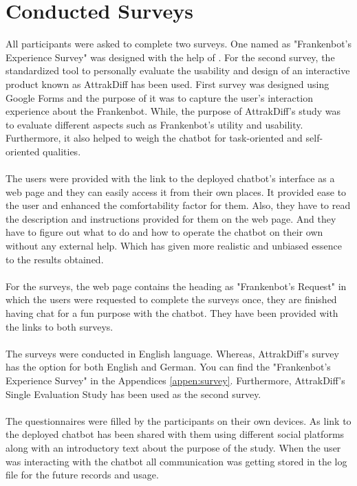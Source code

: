 \section{Conducted Surveys}
All participants were asked to complete two surveys. One named as "Frankenbot's Experience Survey" was designed with the help of \cite{MOLLER200726}\cite{itut}. For the second survey, the standardized tool to personally evaluate the usability and design of an interactive product known as AttrakDiff\cite{attrakdiff} has been used. First survey was designed using Google Forms and the purpose of it was to capture the user's interaction experience about the Frankenbot. While, the purpose of AttrakDiff's study was to evaluate different aspects such as Frankenbot's utility and usability. Furthermore, it also helped to weigh the chatbot for task-oriented and self-oriented qualities. 
\\~\\
The users were provided with the link to the deployed chatbot's interface as a web page and they can easily access it from their own places. It provided ease to the user and enhanced the comfortability factor for them. Also, they have to read the description and instructions provided for them on the web page. And they have to figure out what to do and how to operate the chatbot on their own without any external help. Which has given more realistic and unbiased essence to the results obtained.
\\~\\
For the surveys, the web page contains the heading as "Frankenbot's Request" in which the users were requested to complete the surveys once, they are finished having chat for a fun purpose with the chatbot. They have been provided with the links to both surveys.
\\~\\
The surveys were conducted in English language. Whereas, AttrakDiff's survey has the option for both English and German. You can find the "Frankenbot's Experience Survey" in the Appendices \ref{appen:survey}. Furthermore, AttrakDiff's Single Evaluation Study\cite{indeval} has been used as the second survey.
\\~\\
The questionnaires were filled by the participants on their own devices. As link to the deployed chatbot has been shared with them using different social platforms along with an introductory text about the purpose of the study. When the user was interacting with the chatbot all communication was getting stored in the log file for the future records and usage.

